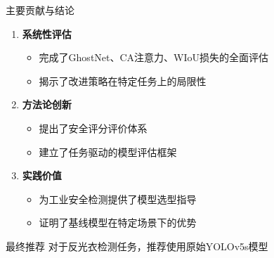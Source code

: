 \documentclass[aspectratio=169]{beamer}
\begin{document}
\begin{frame}{主要贡献与结论}
    \begin{enumerate}
        \item \textbf{系统性评估}
        \begin{itemize}
            \item 完成了GhostNet、CA注意力、WIoU损失的全面评估
            \item 揭示了改进策略在特定任务上的局限性
        \end{itemize}
        
        \item \textbf{方法论创新}
        \begin{itemize}
            \item 提出了安全评分评价体系
            \item 建立了任务驱动的模型评估框架
        \end{itemize}
        
        \item \textbf{实践价值}
        \begin{itemize}
            \item 为工业安全检测提供了模型选型指导
            \item 证明了基线模型在特定场景下的优势
        \end{itemize}
    \end{enumerate}
    
    \begin{block}{最终推荐}
        对于反光衣检测任务，推荐使用原始YOLOv5s模型
    \end{block}
\end{frame}
\end{document}
